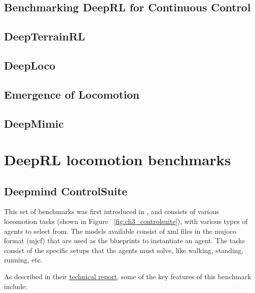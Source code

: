 \subsection{Benchmarking DeepRL for Continuous Control}


\subsection{DeepTerrainRL}


\subsection{DeepLoco}


\subsection{Emergence of Locomotion}


\subsection{DeepMimic}



\section{DeepRL locomotion benchmarks}

\subsection{Deepmind ControlSuite}

This set of benchmarks was first introduced in \cite{Controlsuite}, and consists 
of various locomotion tasks (shown in Figure ~\ref{fig:ch3_controlsuite}), with various types of agents 
to select from. The models available consist of xml files in the mujoco format (mjcf) 
that are used as the blueprints to instantiate an agent. The tasks consist of the specific
setups that the agents must solve, like walking, standing, running, etc.

\figBenchmarkControlSuite

As described in their \href{https://arxiv.org/pdf/1801.00690.pdf}{technical report},
some of the key features of this benchmark include:

